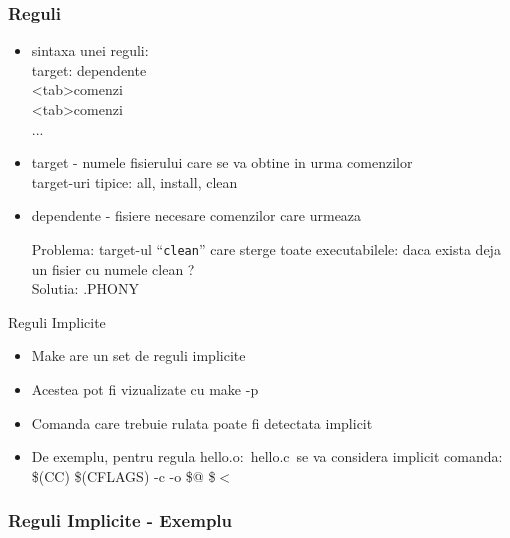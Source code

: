 \documentclass{beamer}
\begin{document}
    \begin{frame}[allowframebreaks]
    \frametitle{Reguli}
    \begin{itemize}
    \setlength{\itemsep}{0.3cm}
    \item sintaxa unei reguli:\\ {\ttfamily target: dependente\\ <tab>comenzi\\ <tab>comenzi\\ ...}
    \item target - numele fisierului care se va obtine in urma comenzilor\\target-uri tipice: all, install, clean
    \item dependente - fisiere necesare comenzilor care urmeaza
    \begin{item} Problema: target-ul ``\texttt{clean}'' care sterge toate executabilele: daca exista deja un fisier cu numele clean ?\\Solutia: .PHONY\\
    \vspace{0.3cm}
    
    \end{item}
    \end{itemize}
    \end{frame}

    \begin{frame}{Reguli Implicite}
    \begin{itemize}
    \setlength{\itemsep}{0.5cm}
    \item Make are un set de reguli implicite
    \item Acestea pot fi vizualizate cu {\ttfamily make -p}
    \item Comanda care trebuie rulata poate fi detectata implicit
    \item De exemplu, pentru regula {\ttfamily hello.o:\ hello.c}\ se va considera implicit comanda:\\ {\ttfamily \$(CC) \$(CFLAGS) -c -o \$@ \$$<$}
    \end{itemize}
    \end{frame}

    \begin{frame}[allowframebreaks]
    \frametitle{Reguli Implicite - Exemplu}
    \\
    \framebreak
    \\
    \framebreak
    \\
    \framebreak
    
    \end{frame}
    
\end{document}
